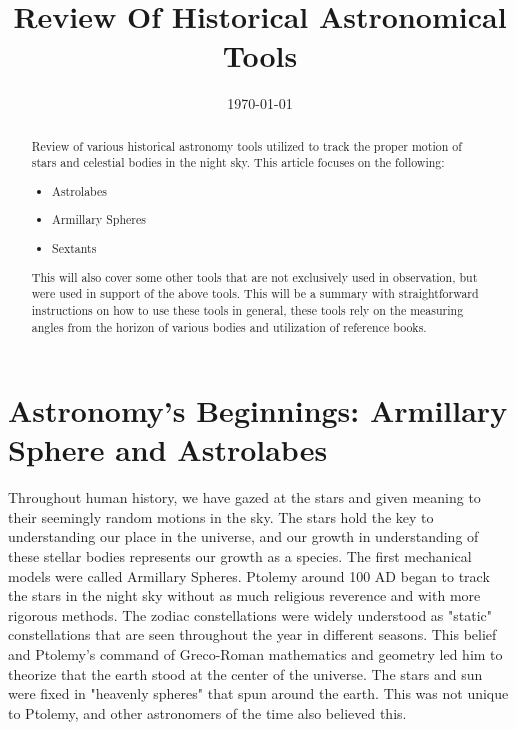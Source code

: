 \documentclass[12pt,oneside,a4paper,english]{article}
\author{}
\title{\textbf{Review Of Historical Astronomical Tools}}
\date{\today}
\begin{document}
\maketitle
\begin{abstract}
Review of various historical astronomy tools utilized to track the proper motion of stars and celestial bodies in the night sky. This article focuses on the following:
\begin{itemize}
\item Astrolabes
\item Armillary Spheres
\item Sextants
\end{itemize}
This will also cover some other tools that are not exclusively used in observation, but were used in support of the above tools. This will be a summary with straightforward instructions on how to use these tools in general, these tools rely on the measuring angles from the horizon of various bodies and utilization of reference books.
\end{abstract}
\section{Astronomy's Beginnings: Armillary Sphere and Astrolabes}
Throughout human history, we have gazed at the stars and given meaning to their seemingly random motions in the sky. The stars hold the key to understanding our place in the universe, and our growth in understanding of these stellar bodies represents our growth as a species. The first mechanical models were called Armillary Spheres. 
Ptolemy around 100 AD began to track the stars in the night sky without as much religious reverence and with more rigorous methods. The zodiac constellations were widely understood as "static" constellations that are seen throughout the year in different seasons. This belief and Ptolemy's command of Greco-Roman mathematics and geometry led him to theorize that the earth stood at the center of the universe. The stars and sun were fixed in "heavenly spheres" that spun around the earth.\cite{ptolo1} This was not unique to Ptolemy, and other astronomers of the time also believed this. 
\end{document}

